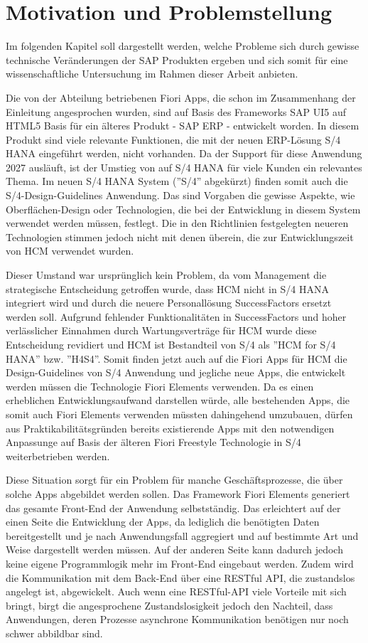 \section{Motivation und Problemstellung}

Im folgenden Kapitel soll dargestellt werden, welche Probleme sich durch gewisse technische Veränderungen der SAP Produkten ergeben und sich somit für eine wissenschaftliche Untersuchung im Rahmen dieser Arbeit anbieten.

Die von der Abteilung betriebenen Fiori Apps, die schon im Zusammenhang der Einleitung angesprochen wurden, sind auf Basis des Frameworks SAP UI5 auf HTML5 Basis für ein älteres Produkt - SAP ERP - entwickelt worden. In diesem Produkt sind viele relevante Funktionen, die mit der neuen ERP-Lösung S/4 HANA eingeführt werden, nicht vorhanden. Da der Support für diese Anwendung 2027 ausläuft, ist der Umstieg von auf S/4 HANA für viele Kunden ein relevantes Thema. Im neuen S/4 HANA System (''S/4'' abgekürzt) finden somit auch die S/4-Design-Guidelines Anwendung. Das sind Vorgaben die gewisse Aspekte, wie \zB Oberflächen-Design oder Technologien, die bei der Entwicklung in diesem System verwendet werden müssen, festlegt. Die in den Richtlinien festgelegten neueren Technologien stimmen jedoch nicht mit denen überein, die zur Entwicklungszeit von HCM verwendet wurden.

Dieser Umstand war ursprünglich kein Problem, da vom Management die strategische Entscheidung getroffen wurde, dass HCM nicht in S/4 HANA integriert wird und durch die neuere Personallösung SuccessFactors ersetzt werden soll. Aufgrund fehlender Funktionalitäten in SuccessFactors und  hoher verlässlicher Einnahmen durch Wartungsverträge für HCM wurde diese Entscheidung revidiert und HCM ist Bestandteil von S/4 als ''HCM for S/4 HANA'' bzw. ''H4S4''. Somit finden jetzt auch auf die Fiori Apps für HCM die Design-Guidelines von S/4 Anwendung und jegliche neue Apps, die entwickelt werden müssen die Technologie Fiori Elements verwenden. Da es einen erheblichen Entwicklungsaufwand darstellen würde, alle bestehenden Apps, die somit auch Fiori Elements verwenden müssten dahingehend umzubauen, dürfen aus Praktikabilitätsgründen bereits existierende Apps mit den notwendigen Anpassunge auf Basis der älteren Fiori Freestyle Technologie in S/4 weiterbetrieben werden.

Diese Situation sorgt für ein Problem für manche Geschäftsprozesse, die über solche Apps abgebildet werden sollen. Das Framework Fiori Elements generiert das gesamte Front-End der Anwendung selbstständig. Das erleichtert auf der einen Seite die Entwicklung der Apps, da lediglich die benötigten Daten bereitgestellt und je nach Anwendungsfall aggregiert und auf bestimmte Art und Weise dargestellt werden müssen. Auf der anderen Seite kann dadurch jedoch keine eigene Programmlogik mehr im Front-End eingebaut werden. Zudem wird die Kommunikation mit dem Back-End über eine RESTful API, die zustandslos angelegt ist, abgewickelt. Auch wenn eine RESTful-API viele Vorteile mit sich bringt, birgt die angesprochene Zustandslosigkeit jedoch den Nachteil, dass Anwendungen, deren Prozesse asynchrone Kommunikation benötigen nur noch schwer abbildbar sind.

